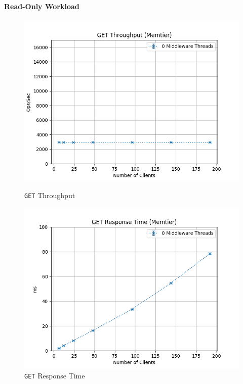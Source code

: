 \documentclass[11pt,a4paper]{article}
\begin{document}
\paragraph{Read-Only Workload}
%
\begin{figure}[H]
    \centering
    \captionsetup{width=0.4\textwidth}
    \begin{minipage}{0.5\textwidth}
        \centering
        \includegraphics[width=\textwidth]{../illustrations/plots/1_1_one_server/0-1/memtier_get_tp_s.png}
        \caption{\texttt{GET} Throughput}
        \label{fig:one_server_get_tp}
    \end{minipage}\hfill
    \begin{minipage}{0.5\textwidth}
        \centering
        \includegraphics[width=\textwidth]{../illustrations/plots/1_1_one_server/0-1/memtier_get_rt_ms.png}
        \caption{\texttt{GET} Response Time}
        \label{fig:one_server_get_rt}
    \end{minipage}
\end{figure}
\end{document}
